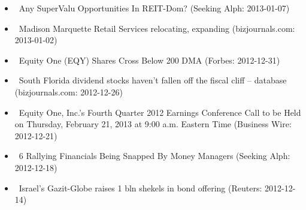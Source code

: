 \documentclass[11pt,asymmetric]{article}
\begin{document}
\begin{itemize}
\item\ Any SuperValu Opportunities In REIT-Dom? (Seeking Alph: 2013-01-07)
\item\ Madison Marquette Retail Services relocating, expanding (bizjournals.com: 2013-01-02)
\item\ Equity One (EQY) Shares Cross Below 200 DMA (Forbes: 2012-12-31)
\item\ South Florida dividend stocks haven't fallen off the fiscal cliff – database (bizjournals.com: 2012-12-26)
\item\ Equity One, Inc.’s Fourth Quarter 2012 Earnings Conference Call to be Held on Thursday, February 21, 2013 at 9:00 a.m. Eastern Time (Business Wire: 2012-12-21)
\item\ 6 Rallying Financials Being Snapped By Money Managers (Seeking Alph: 2012-12-18)
\item\ Israel's Gazit-Globe raises 1 bln shekels in bond offering (Reuters: 2012-12-14)
\end{itemize}
\end{document}

